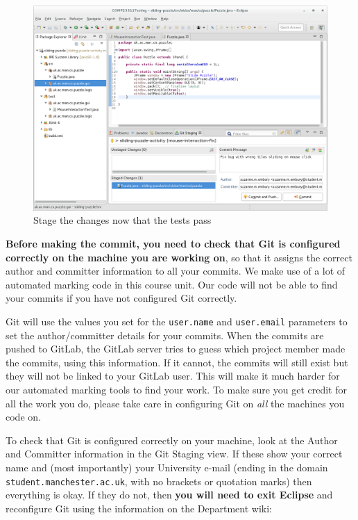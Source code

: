 \documentclass[
]{book}
\begin{document}
\begin{figure}

{\centering \includegraphics[width=1\linewidth]{images/stageTheChangesNowTheTestsPass} 

}

\caption{Stage the changes now that the tests pass}\label{fig:stageTheChangesNowTheTestsPass-fig}
\end{figure}

\textbf{Before making the commit, you need to check that Git is configured correctly on the machine you are working on}, so that it assigns the correct author and committer information to all your commits. We make use of a lot of automated marking code in this course unit. Our code will not be able to find your commits if you have not configured Git correctly.

Git will use the values you set for the \texttt{user.name} and \texttt{user.email} parameters to set the author/committer details for your commits. When the commits are pushed to GitLab, the GitLab server tries to guess which project member made the commits, using this information. If it cannot, the commits will still exist but they will not be linked to your GitLab user. This will make it much harder for our automated marking tools to find your work. To make sure you get credit for all the work you do, please take care in configuring Git on \emph{all} the machines you code on.

To check that Git is configured correctly on your machine, look at the Author and Committer information in the Git Staging view. If these show your correct name and (most importantly) your University e-mail (ending in the domain \texttt{student.manchester.ac.uk}, with no brackets or quotation marks) then everything is okay. If they do not, then \textbf{you will need to exit Eclipse} and reconfigure Git using the information on the Department wiki:
\end{document}

